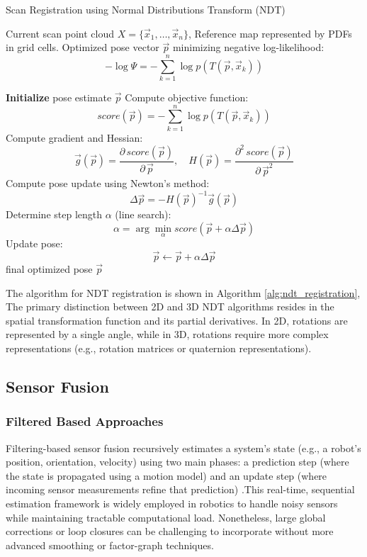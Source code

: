     \begin{algorithm}[htbp]
    \caption{Scan Registration using Normal Distributions Transform (NDT)}
    \label{alg:ndt_registration}
    \begin{algorithmic}[1]
        \Require Current scan point cloud $X = \{\vec{x}_1, \dots, \vec{x}_n\}$, Reference map represented by PDFs in grid cells.
        \Ensure Optimized pose vector $\vec{p}$ minimizing negative log-likelihood:
        \[
        -\log \Psi = -\sum_{k=1}^{n} \log p\left(T(\vec{p}, \vec{x}_k)\right)
        \]
    
        \State \textbf{Initialize} pose estimate $\vec{p}$
        \Repeat
        \State Compute objective function:
            \[
            score(\vec{p}) = -\sum_{k=1}^{n}\log p\left(T(\vec{p}, \vec{x}_k)\right)
            \]
        \State Compute gradient and Hessian:
            \[
            \vec{g}(\vec{p}) = \frac{\partial\, score(\vec{p})}{\partial\,\vec{p}}, \quad H(\vec{p}) = \frac{\partial^2\, score(\vec{p})}{\partial\,\vec{p}^2}
            \]
        \State Compute pose update using Newton's method:
            \[
            \Delta\vec{p} = -H(\vec{p})^{-1}\vec{g}(\vec{p})
            \]
        \State Determine step length $\alpha$ (line search):
            \[
            \alpha = \arg\min_{\alpha} score(\vec{p} + \alpha \Delta\vec{p})
            \]
        \State Update pose:
            \[
            \vec{p} \leftarrow \vec{p} + \alpha \Delta\vec{p}
            \]
        \State \Return final optimized pose $\vec{p}$
    \end{algorithmic}
    \end{algorithm}

The algorithm for NDT registration is shown in Algorithm \ref{alg:ndt_registration}, The primary distinction between 2D and 3D NDT algorithms resides in the spatial transformation function and its partial derivatives. In 2D, rotations are represented by a single angle, while in 3D, rotations require more complex representations (e.g., rotation matrices or quaternion representations).

\subsection{Sensor Fusion}

\subsubsection{Filtered Based Approaches}
Filtering-based sensor fusion recursively estimates a system’s state (e.g., a robot’s position, orientation, velocity) using two main phases: a prediction step (where the state is propagated using a motion model) and an update step (where incoming sensor measurements refine that prediction) \cite{thrun2005probabilistic}.This real-time, sequential estimation framework is widely employed in robotics to handle noisy sensors while maintaining tractable computational load. Nonetheless, large global corrections or loop closures can be challenging to incorporate without more advanced smoothing or factor-graph techniques\cite{cadena2016past}.

